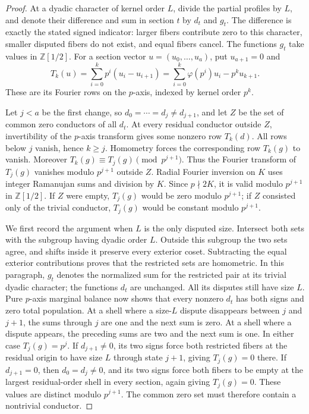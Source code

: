\begin{proof}
At a dyadic character of kernel order \(L\), divide the partial
profiles by \(L\), and denote their difference and sum in section
\(t\) by \(d_t\) and \(g_t\). The difference is exactly the stated
signed indicator: larger fibers contribute zero to this character,
smaller disputed fibers do not exist, and equal fibers cancel.
The functions \(g_t\) take values in \(\mathbb Z[1/2]\). For a section
vector \(u=(u_0,\ldots,u_a)\), put \(u_{a+1}=0\) and
\begin{equation}
T_k(u)=\sum_{i=0}^kp^i(u_i-u_{i+1})
      =\sum_{i=0}^k\varphi(p^i)u_i-p^ku_{k+1}.
\label{eq:primary-T}
\end{equation}
These are its Fourier rows on the \(p\)-axis, indexed by kernel
order \(p^k\).

Let \(j<a\) be the first change, so
\(d_0=\cdots=d_j\ne d_{j+1}\), and let \(Z\) be the set of
common zero conductors of all \(d_t\). At every residual conductor
outside \(Z\), invertibility of the \(p\)-axis transform gives some
nonzero row \(T_k(d)\). All rows below \(j\) vanish, hence \(k\ge j\).
Homometry forces the corresponding row \(T_k(g)\) to vanish. Moreover
\(T_k(g)\equiv T_j(g)\pmod{p^{j+1}}\). Thus the Fourier transform
of \(T_j(g)\) vanishes modulo \(p^{j+1}\) outside \(Z\).
Radial Fourier inversion on \(K\) uses integer Ramanujan sums and
division by \(K\). Since \(p\nmid 2K\), it is valid modulo
\(p^{j+1}\) in \(\mathbb Z[1/2]\). If \(Z\) were empty,
\(T_j(g)\) would be zero modulo \(p^{j+1}\); if \(Z\) consisted
only of the trivial conductor, \(T_j(g)\) would be constant modulo
\(p^{j+1}\).

We first record the argument when \(L\) is the only disputed size.
Intersect both sets with the subgroup having dyadic order \(L\).
Outside this subgroup the two sets agree, and shifts inside it
preserve every exterior coset. Subtracting the equal exterior
contributions proves that the restricted sets are homometric.
In this paragraph, \(g_t\) denotes the normalized sum for the
restricted pair at its trivial dyadic character; the functions \(d_t\)
are unchanged. All its disputes still have size \(L\). Pure \(p\)-axis marginal
balance now shows that every nonzero \(d_t\) has both signs and
zero total population. At a shell where a size-\(L\) dispute
disappears between \(j\) and \(j+1\), the sums through \(j\)
are one and the next sum is zero. At a shell where a dispute appears,
the preceding sums are two and the next sum is one. In either case
\(T_j(g)=p^j\). If \(d_{j+1}\ne0\), its two signs force both
restricted fibers at the residual origin to have size \(L\) through
state \(j+1\), giving \(T_j(g)=0\) there. If \(d_{j+1}=0\),
then \(d_0=d_j\ne0\), and its two signs force both fibers to be
empty at the largest residual-order shell in every section, again
giving \(T_j(g)=0\). These values are distinct modulo \(p^{j+1}\).
The common zero set must therefore contain a nontrivial conductor.


\end{proof}
